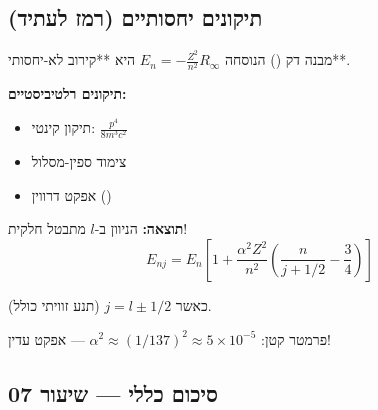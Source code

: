 \subsection{תיקונים יחסותיים (רמז לעתיד)}

\begin{importantbox}{מבנה דק ()}
הנוסחה $E_n = -\frac{Z^2}{n^2}R_\infty$ היא **קירוב לא-יחסותי**.

\textbf{תיקונים רלטיביסטיים:}
\begin{itemize}
    \item תיקון קינטי: $\frac{p^4}{8m^3c^2}$
    \item צימוד ספין-מסלול
    \item אפקט דרווין ()
\end{itemize}

\textbf{תוצאה:} הניוון ב-$l$ מתבטל חלקית!
\[
E_{nj} = E_n \left[1 + \frac{\alpha^2 Z^2}{n^2}\left(\frac{n}{j+1/2} - \frac{3}{4}\right)\right]
\]

כאשר $j = l \pm 1/2$ (תנע זוויתי כולל).

פרמטר קטן: $\alpha^2 \approx (1/137)^2 \approx 5 \times 10^{-5}$ — אפקט עדין!
\end{importantbox}

\subsection{סיכום כללי — שיעור 07}


